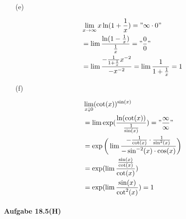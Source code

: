 \begin{enumerate}
\newpage

\item[(e)]

\begin{align*}
&\lim_{x\rightarrow\infty}x\ln(1+\frac{1}{x})="\infty\cdot0"\\
&=\lim\frac{\ln(1-\frac{1}{x})}{\frac{1}{x}}="\frac{0}{0}"\\
&=\lim\frac{-\frac{1}{1+\frac{1}{x}}x^{-2}}{-x^{-2}}=\lim\frac{1}{1+\frac{1}{x}}=1
\end{align*}

\item[(f)]

\begin{align*}
&\lim_{x\downarrow0}(\cot(x))^{\sin(x)}\\
&=\lim\exp(\frac{\ln(\cot(x))}{\frac{1}{\sin(x)}})="\frac{\infty}{\infty}"\\
&=\exp\bigg(\lim\frac{-\frac{1}{\cot(x)}\cdot\frac{1}{\sin^2(x)}}{-\sin^{-2}(x)\cdot\cos(x)}\bigg)\\
&=\exp(\lim\frac{\frac{\sin(x)}{\cot(x)}}{\cot(x)})\\
&=\exp(\lim\frac{\sin(x)}{\cot^2(x)})=1
\end{align*}

\end{enumerate}

\newpage

\paragraph{Aufgabe 18.5(H)}

